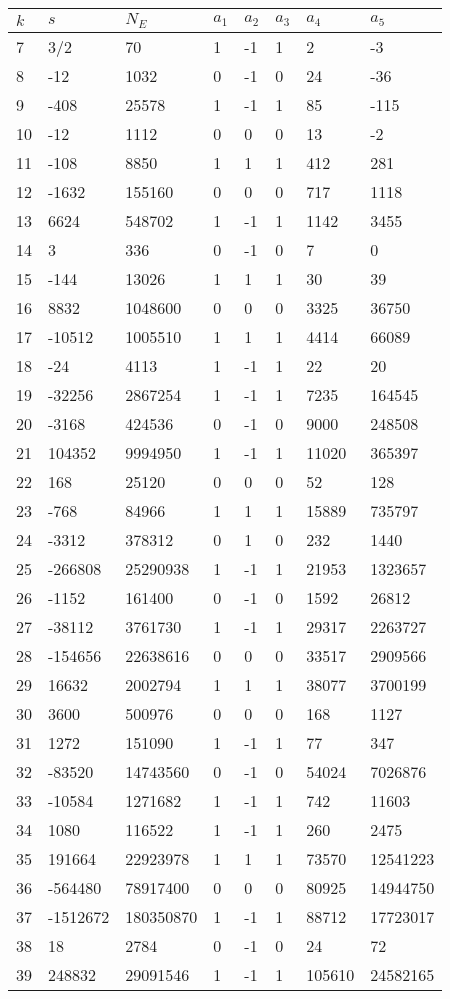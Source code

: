 \documentclass{amsart}
\begin{document}
\begin{longtable}{|l|l|l|lllll|}
\hline
$k$ & $s$ & $N_E$ & $a_1$ & $a_2$ & $a_3$ & $a_4$ & $a_5$\\
\hline
7&3/2&70&1&-1&1&2&-3\\
8&-12&1032&0&-1&0&24&-36\\
9&-408&25578&1&-1&1&85&-115\\
10&-12&1112&0&0&0&13&-2\\
11&-108&8850&1&1&1&412&281\\
12&-1632&155160&0&0&0&717&1118\\
13&6624&548702&1&-1&1&1142&3455\\
14&3&336&0&-1&0&7&0\\
15&-144&13026&1&1&1&30&39\\
16&8832&1048600&0&0&0&3325&36750\\
17&-10512&1005510&1&1&1&4414&66089\\
18&-24&4113&1&-1&1&22&20\\
19&-32256&2867254&1&-1&1&7235&164545\\
20&-3168&424536&0&-1&0&9000&248508\\
21&104352&9994950&1&-1&1&11020&365397\\
22&168&25120&0&0&0&52&128\\
23&-768&84966&1&1&1&15889&735797\\
24&-3312&378312&0&1&0&232&1440\\
25&-266808&25290938&1&-1&1&21953&1323657\\
26&-1152&161400&0&-1&0&1592&26812\\
27&-38112&3761730&1&-1&1&29317&2263727\\
28&-154656&22638616&0&0&0&33517&2909566\\
29&16632&2002794&1&1&1&38077&3700199\\
30&3600&500976&0&0&0&168&1127\\
31&1272&151090&1&-1&1&77&347\\
32&-83520&14743560&0&-1&0&54024&7026876\\
33&-10584&1271682&1&-1&1&742&11603\\
34&1080&116522&1&-1&1&260&2475\\
35&191664&22923978&1&1&1&73570&12541223\\
36&-564480&78917400&0&0&0&80925&14944750\\
37&-1512672&180350870&1&-1&1&88712&17723017\\
38&18&2784&0&-1&0&24&72\\
39&248832&29091546&1&-1&1&105610&24582165\\

\end{longtable}
\end{document}
